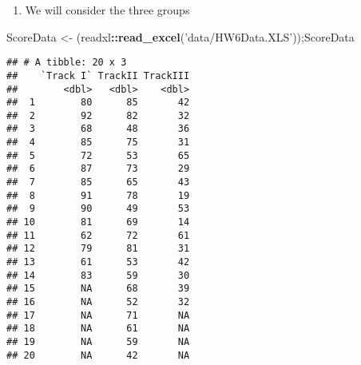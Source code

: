 \documentclass[
]{article}
\newenvironment{Shaded}{\begin{snugshade}}{\end{snugshade}}
\newcommand{\DataTypeTok}[1]{\textcolor[rgb]{0.13,0.29,0.53}{#1}}
\newcommand{\DecValTok}[1]{\textcolor[rgb]{0.00,0.00,0.81}{#1}}
\newcommand{\KeywordTok}[1]{\textcolor[rgb]{0.13,0.29,0.53}{\textbf{#1}}}
\newcommand{\NormalTok}[1]{#1}
\newcommand{\OperatorTok}[1]{\textcolor[rgb]{0.81,0.36,0.00}{\textbf{#1}}}
\newcommand{\StringTok}[1]{\textcolor[rgb]{0.31,0.60,0.02}{#1}}
\providecommand{\tightlist}{%
  \setlength{\itemsep}{0pt}\setlength{\parskip}{0pt}}
\begin{document}
\begin{enumerate}
\def\labelenumi{\alph{enumi}.}
\tightlist
\item
  We will consider the three groups
\end{enumerate}

\begin{Shaded}
\begin{Highlighting}[]
\NormalTok{ScoreData <-}\StringTok{ }\NormalTok{(readxl}\OperatorTok{::}\KeywordTok{read_excel}\NormalTok{(}\StringTok{'data/HW6Data.XLS'}\NormalTok{));ScoreData}
\end{Highlighting}
\end{Shaded}

\begin{verbatim}
## # A tibble: 20 x 3
##    `Track I` TrackII TrackIII
##        <dbl>   <dbl>    <dbl>
##  1        80      85       42
##  2        92      82       32
##  3        68      48       36
##  4        85      75       31
##  5        72      53       65
##  6        87      73       29
##  7        85      65       43
##  8        91      78       19
##  9        90      49       53
## 10        81      69       14
## 11        62      72       61
## 12        79      81       31
## 13        61      53       42
## 14        83      59       30
## 15        NA      68       39
## 16        NA      52       32
## 17        NA      71       NA
## 18        NA      61       NA
## 19        NA      59       NA
## 20        NA      42       NA
\end{verbatim}

\begin{Shaded}
\end{Shaded}
\end{document}

